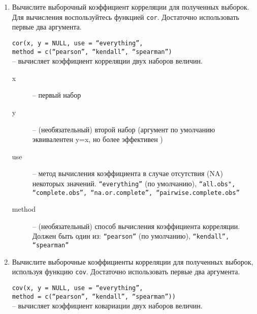 \begin{enumerate}
    \newpage

    \item Вычислите выборочный коэффициент корреляции для полученных выборок. Для вычисления 
          воспользуйтесь функцией \texttt{cor}. Достаточно использовать первые два аргумента.

          \begin{mdframed}[style=BadassFrame]

              \texttt{cor(x, y = NULL, use = ``everything'', \\ \phantom{    } method = c(``pearson'', ``kendall'', ``spearman'')} \\
                -- вычисляет коэффициент корреляции двух наборов величин. 
              \begin{description}

                \item[x] -- первый набор
                \item[y] -- (необязательный) второй набор (аргумент по умолчанию эквивалентен y=x, но более эффективен )
                \item[use] -- метод вычисления коэффициента в случае отсутствия (NA) некоторых значений.
                     \texttt{``everything''} (по умолчанию),  \texttt{``all.obs", ``complete.obs'', ``na.or.complete'', ``pairwise.complete.obs''}
                \item[method] -- (необязательный) способ вычисления коэффициента корреляции. Должен быть один из: 
                     \texttt{``pearson''} (по умолчанию), \texttt{``kendall'', ``spearman''}
              \end{description}
          \end{mdframed}

    \item Вычислите выборочные коэффициенты корреляции для полученных выборок, используя функцию 
          \texttt{cov}. Достаточно использовать первые два аргумента.

          \begin{mdframed}[style=BadassFrame]

              \texttt{cov(x, y = NULL, use = ``everything'', \\ \phantom{    } method = c(``pearson'', ``kendall'', ``spearman''))} \\
                    -- вычисляет коэффициент ковариации двух наборов величин. 
              \begin{description}


\end{description}
\end{mdframed}
\end{enumerate}

